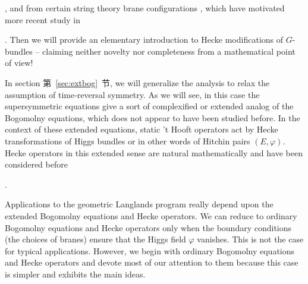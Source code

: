  
\cite{ref111,ref112,ref113,ref114}, and from certain string theory brane
configurations \cite{ref115}, which have motivated more recent study in

\cite{ref116,ref117,ref118}. Then we will provide an
elementary introduction to Hecke modifications of $G$-bundles --
claiming neither novelty nor completeness from a mathematical
point of view!

In section 第~\ref{sec:extbog}~节, we will generalize the analysis to relax the
assumption of time-reversal symmetry. As we will see, in this case
the supersymmetric equations give a sort of complexified or
extended analog of the Bogomolny equations, which does not appear
to have been studied before. In the context of these extended
equations, static 't Hooft operators act by Hecke transformations
of Higgs bundles or in other words  of Hitchin pairs
$(E,\varphi)$. Hecke operators in this extended sense are natural
mathematically and have been considered before

\cite{ref119,ref120}.

Applications to the geometric Langlands program really depend upon
the extended Bogomolny equations and Hecke operators. We can
reduce to ordinary Bogomolny equations and Hecke operators only
when the boundary conditions (the choices of branes) ensure that
the Higgs field $\varphi$ vanishes. This is not the case for
typical applications.  However, we begin with ordinary Bogomolny
equations and Hecke operators and devote most of our attention to
them because this case is simpler and exhibits the main ideas.
